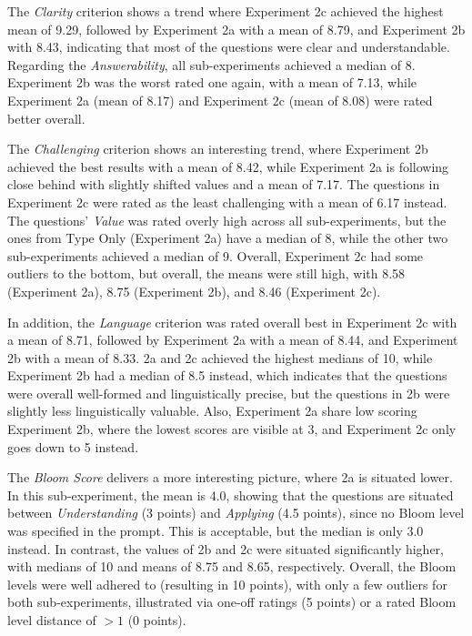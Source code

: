 The \textit{Clarity} criterion shows a trend where Experiment 2c achieved the highest mean of 9.29, followed by Experiment 2a with a mean of 8.79, and Experiment 2b with 8.43, indicating that most of the questions were clear and understandable. Regarding the \textit{Answerability}, all sub-experiments achieved a median of 8. Experiment 2b was the worst rated one again, with a mean of 7.13, while Experiment 2a (mean of 8.17) and Experiment 2c (mean of 8.08) were rated better overall.

The \textit{Challenging} criterion shows an interesting trend, where Experiment 2b achieved the best results with a mean of 8.42, while Experiment 2a is following close behind with slightly shifted values and a mean of 7.17. The questions in Experiment 2c were rated as the least challenging with a mean of 6.17 instead. The questions' \textit{Value} was rated overly high across all sub-experiments, but the ones from Type Only (Experiment 2a) have a median of 8, while the other two sub-experiments achieved a median of 9. Overall, Experiment 2c had some outliers to the bottom, but overall, the means were still high, with 8.58 (Experiment 2a), 8.75 (Experiment 2b), and 8.46 (Experiment 2c).

In addition, the \textit{Language} criterion was rated overall best in Experiment 2c with a mean of 8.71, followed by Experiment 2a with a mean of 8.44, and Experiment 2b with a mean of 8.33. 2a and 2c achieved the highest medians of 10, while Experiment 2b had a median of 8.5 instead, which indicates that the questions were overall well-formed and linguistically precise, but the questions in 2b were slightly less linguistically valuable. Also, Experiment 2a share low scoring Experiment 2b, where the lowest scores are visible at 3, and Experiment 2c only goes down to 5 instead.

The \textit{Bloom Score} delivers a more interesting picture, where 2a is situated lower. In this sub-experiment, the mean is 4.0, showing that the questions are situated between \textit{Understanding} (3 points) and \textit{Applying} (4.5 points), since no Bloom level was specified in the prompt. This is acceptable, but the median is only 3.0 instead. In contrast, the values of 2b and 2c were situated significantly higher, with medians of 10 and means of 8.75 and 8.65, respectively. Overall, the Bloom levels were well adhered to (resulting in 10 points), with only a few outliers for both sub-experiments, illustrated via one-off ratings (5 points) or a rated Bloom level distance of $>1$ (0 points).

